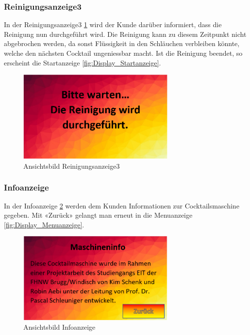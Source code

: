 \subsubsection{Reinigungsanzeige3}\label{subsubsec:Display_Reinigungsanzeige3}

In der Reinigungsanzeige3 \ref{fig:Display_Reinigungsanzeige3} wird der Kunde darüber informiert, dass die Reinigung nun durchgeführt wird. Die Reinigung kann zu diesem Zeitpunkt nicht abgebrochen werden, da sonst Flüssigkeit in den Schläuchen verbleiben könnte, welche den nächsten Cocktail ungeniessbar macht. Ist die Reinigung beendet, so erscheint die Startanzeige \ref{fig:Display_Startanzeige}.

\begin{figure}[h!]
\centering
\includegraphics[width=0.7\textwidth]{graphics/Display_Reinigungsanzeige3.png}
\caption{Ansichtsbild Reinigungsanzeige3}
\label{fig:Display_Reinigungsanzeige3}
\end{figure}

\newpage

\subsubsection{Infoanzeige}\label{subsubsec:Display_Infoanzeige}

In der Infoanzeige \ref{fig:Display_Infoanzeige} werden dem Kunden Informationen zur Cocktailsmaschine gegeben. Mit «Zurück» gelangt man erneut in die Menuanzeige \ref{fig:Display_Menuanzeige}.

\begin{figure}[h!]
\centering
\includegraphics[width=0.7\textwidth]{graphics/Display_Infoanzeige.png}
\caption{Ansichtsbild Infoanzeige}
\label{fig:Display_Infoanzeige}
\end{figure}

